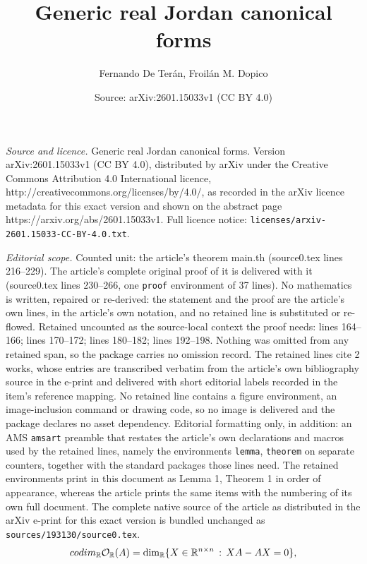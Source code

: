 \documentclass[10pt,a4paper]{amsart}
\title{Generic real Jordan canonical forms}
\author{Fernando De Ter\'an, Froil\'an M. Dopico}
\date{Source: arXiv:2601.15033v1 (CC BY 4.0)}
\newcommand{\R}{\mathbb R}
\newcommand{\cod}{{\rm codim}_\R}
\newcommand{\orbr}{{\mathcal O}_{\R}}
\begin{document}
\maketitle

\noindent\emph{Source and licence.} Generic real Jordan canonical forms. Version arXiv:2601.15033v1 (CC BY 4.0), distributed by arXiv under the Creative Commons Attribution 4.0 International licence, http://creativecommons.org/licenses/by/4.0/, as recorded in the arXiv licence metadata for this exact version and shown on the abstract page https://arxiv.org/abs/2601.15033v1. Full licence notice: \texttt{licenses/arxiv-2601.15033-CC-BY-4.0.txt}.\par\smallskip

\noindent\textit{Editorial scope.} Counted unit: the article's theorem main.th (source0.tex lines 216--229). The article's complete original proof of it is delivered with it (source0.tex lines 230--266, one \texttt{proof} environment of 37 lines). No mathematics is written, repaired or re-derived: the statement and the proof are the article's own lines, in the article's own notation, and no retained line is substituted or re-flowed.  Retained uncounted as the source-local context the proof needs: lines 164--166; lines 170--172; lines 180--182; lines 192--198.  Nothing was omitted from any retained span, so the package carries no omission record.  The retained lines cite 2 works, whose entries are transcribed verbatim from the article's own bibliography source in the e-print and delivered with short editorial labels recorded in the item's reference mapping.  No retained line contains a figure environment, an image-inclusion command or drawing code, so no image is delivered and the package declares no asset dependency.  Editorial formatting only, in addition: an AMS \texttt{amsart} preamble that restates the article's own declarations and macros used by the retained lines, namely the environments \texttt{lemma}, \texttt{theorem} on separate counters, together with the standard packages those lines need.  The retained environments print in this document as Lemma 1, Theorem 1 in order of appearance, whereas the article prints the same items with the numbering of its own full document.  The complete native source of the article as distributed in the arXiv e-print for this exact version is bundled unchanged as \texttt{sources/193130/source0.tex}.
\begin{equation} \label{eq.codimorb}
\cod\orbr(A)=\dim_\R\{X\in\R^{n\times n} \, : \, XA-AX=0  \},
\end{equation}
\end{document}
